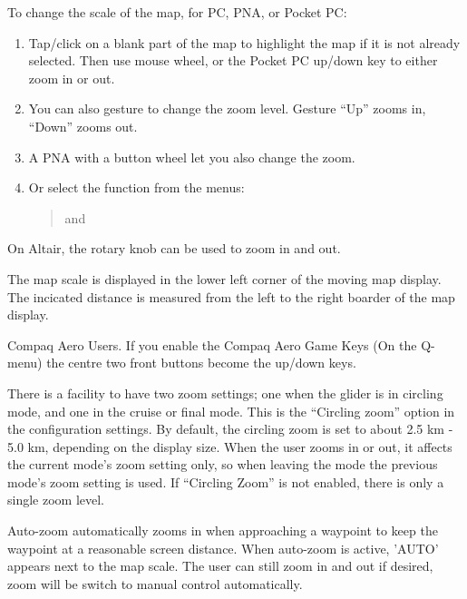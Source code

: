 \documentclass[a4paper,12pt]{refrep}
\begin{document}
To change the scale of the map, for PC, PNA, or Pocket PC:
\begin{enumerate}
\item Tap/click on a blank part of the map to highlight the map if it is not
already selected.
Then use mouse wheel, or the Pocket PC up/down key to either zoom
in or out.
\item You can also gesture to change the zoom level. Gesture 
``Up'' zooms in, ``Down'' zooms out.
\item A PNA with a button wheel let you also change the zoom. 
\item Or select the function from the menus:
\begin{quote}
\blink{} and \blink{}
\end{quote}
\end{enumerate}
On Altair, the rotary knob can be used to zoom in and out.

The map scale is displayed in the lower left corner of the moving map
display. The incicated distance is measured from the left to the right boarder
of the map display.

Compaq Aero Users. If you enable the Compaq Aero Game Keys (On the
Q-menu) the centre two front buttons become the up/down keys.

There is a facility to have two zoom settings; one when the glider is
in circling mode, and one in the cruise or final mode.  This is the ``Circling
zoom'' option in the  configuration settings.  
By default, the circling zoom is set to about 2.5 km - 5.0 km, depending on the
display size. When the user zooms in or out, it affects the current
mode's zoom setting only, so when leaving the mode the previous mode's
zoom setting is used.  If ``Circling Zoom'' is not enabled,
there is only a single zoom level.

Auto-zoom automatically zooms in when approaching a waypoint to keep
the waypoint at a reasonable screen distance. When auto-zoom is active,
'AUTO' appears next to the map scale. The user can still zoom
in and out if desired, zoom will be switch to manual control automatically.
\end{document}
